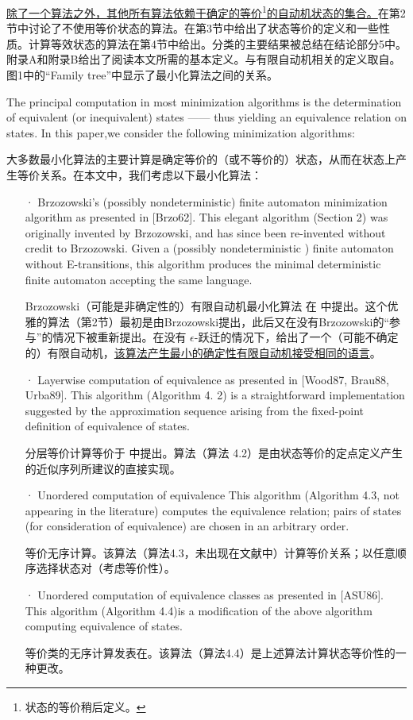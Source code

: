 \uline{除了一个算法之外，其他所有算法依赖于确定的等价}\footnote{状态的等价稍后定义。}\uline{的自动机状态的集合。}在第2节中讨论了不使用等价状态的算法。在第3节中给出了状态等价的定义和一些性质。计算等效状态的算法在第4节中给出。分类的主要结果被总结在结论部分5中。附录A和附录B给出了阅读本文所需的基本定义。与有限自动机相关的定义取自\cite{Wats93}。图1中的“Family tree”中显示了最小化算法之间的关系。

The principal computation in most minimization algorithms is the determination of equivalent (or inequivalent) states —— thus yielding an equivalence relation on states. In this paper,we consider the following minimization algorithms:

大多数最小化算法的主要计算是确定等价的（或不等价的）状态，从而在状态上产生等价关系。在本文中，我们考虑以下最小化算法：

\begin{itemize}
    \item[·] Brzozowski's (possibly nondeterministic) finite automaton minimization algorithm as presented in [Brzo62]. This elegant algorithm (Section 2) was originally invented by Brzozowski, and has since been re-invented without credit to Brzozowski. Given a (possibly nondeterministic ) finite automaton without E-transitions, this algorithm produces the minimal deterministic finite automaton accepting the same language.
    
    Brzozowski（可能是非确定性的）有限自动机最小化算法 在 \cite{Brzo62} 中提出。这个优雅的算法（第2节）最初是由Brzozowski提出，此后又在没有Brzozowski的“参与”的情况下被重新提出。在没有 $\epsilon$-跃迁的情况下，给出了一个（可能不确定的）有限自动机，\uline{该算法产生最小的确定性有限自动机接受相同的语言}。

    \item[·] Layerwise computation of equivalence as presented in [Wood87, \cite{Moor56} Brau88, Urba89]. This algorithm (Algorithm 4. 2) is a straightforward implementation suggested by the approximation sequence arising from the fixed-point definition of equivalence of states. 

    分层等价计算等价于 \cite{Wood87, Moor56, Brau88, Urba89} 中提出。算法（算法 4.2）是由状态等价的定点定义产生的近似序列所建议的直接实现。

    \item[·] Unordered computation of equivalence This algorithm (Algorithm 4.3, not appearing in the literature) computes the equivalence relation; pairs of states (for consideration of equivalence) are chosen in an arbitrary order.

    等价无序计算。该算法（算法4.3，未出现在文献中）计算等价关系；以任意顺序选择状态对（考虑等价性）。

    \item[·] Unordered computation of equivalence classes as presented in [ASU86]. This algorithm (Algorithm 4.4)is a modification of the above algorithm computing equivalence of states.

    等价类的无序计算发表在\cite{ASU86}。该算法（算法4.4）是上述算法计算状态等价性的一种更改。

\end{itemize}

